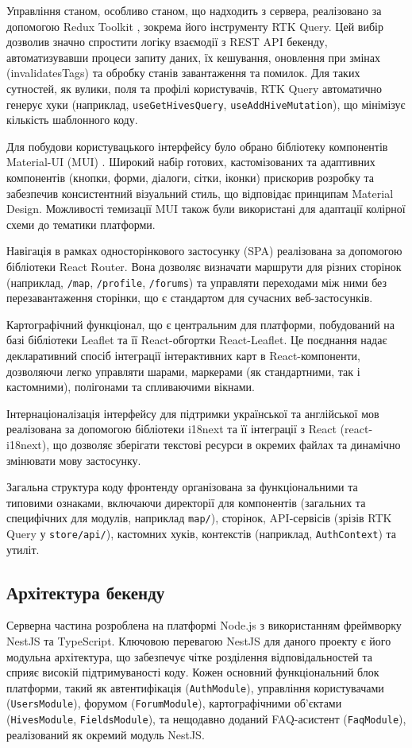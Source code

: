 Управління станом, особливо станом, що надходить з сервера, реалізовано за допомогою Redux Toolkit \cite{reduxtoolkit}, зокрема його інструменту RTK Query. Цей вибір дозволив значно спростити логіку взаємодії з REST API бекенду, автоматизувавши процеси запиту даних, їх кешування, оновлення при змінах (invalidatesTags) та обробку станів завантаження та помилок. Для таких сутностей, як вулики, поля та профілі користувачів, RTK Query автоматично генерує хуки (наприклад, \texttt{useGetHivesQuery}, \texttt{useAddHiveMutation}), що мінімізує кількість шаблонного коду.

Для побудови користувацького інтерфейсу було обрано бібліотеку компонентів Material-UI (MUI) \cite{materialui}. Широкий набір готових, кастомізованих та адаптивних компонентів (кнопки, форми, діалоги, сітки, іконки) прискорив розробку та забезпечив консистентний візуальний стиль, що відповідає принципам Material Design. Можливості темизації MUI також були використані для адаптації колірної схеми до тематики платформи.

Навігація в рамках односторінкового застосунку (SPA) реалізована за допомогою бібліотеки React Router. Вона дозволяє визначати маршрути для різних сторінок (наприклад, \texttt{/map}, \texttt{/profile}, \texttt{/forums}) та управляти переходами між ними без перезавантаження сторінки, що є стандартом для сучасних веб-застосунків.

Картографічний функціонал, що є центральним для платформи, побудований на базі бібліотеки Leaflet \cite{leaflet} та її React-обгортки React-Leaflet. Це поєднання надає декларативний спосіб інтеграції інтерактивних карт в React-компоненти, дозволяючи легко управляти шарами, маркерами (як стандартними, так і кастомними), полігонами та спливаючими вікнами.

Інтернаціоналізація інтерфейсу для підтримки української та англійської мов реалізована за допомогою бібліотеки i18next \cite{i18next} та її інтеграції з React (react-i18next), що дозволяє зберігати текстові ресурси в окремих файлах та динамічно змінювати мову застосунку.

Загальна структура коду фронтенду організована за функціональними та типовими ознаками, включаючи директорії для компонентів (загальних та специфічних для модулів, наприклад \texttt{map/}), сторінок, API-сервісів (зрізів RTK Query у \texttt{store/api/}), кастомних хуків, контекстів (наприклад, \texttt{AuthContext}) та утиліт.

\subsection{Архітектура бекенду}
Серверна частина розроблена на платформі Node.js з використанням фреймворку NestJS \cite{nestjs} та TypeScript. Ключовою перевагою NestJS для даного проекту є його модульна архітектура, що забезпечує чітке розділення відповідальностей та сприяє високій підтримуваності коду. Кожен основний функціональний блок платформи, такий як автентифікація (\texttt{AuthModule}), управління користувачами (\texttt{UsersModule}), форумом (\texttt{ForumModule}), картографічними об'єктами (\texttt{HivesModule}, \texttt{FieldsModule}), та нещодавно доданий FAQ-асистент (\texttt{FaqModule}), реалізований як окремий модуль NestJS.

